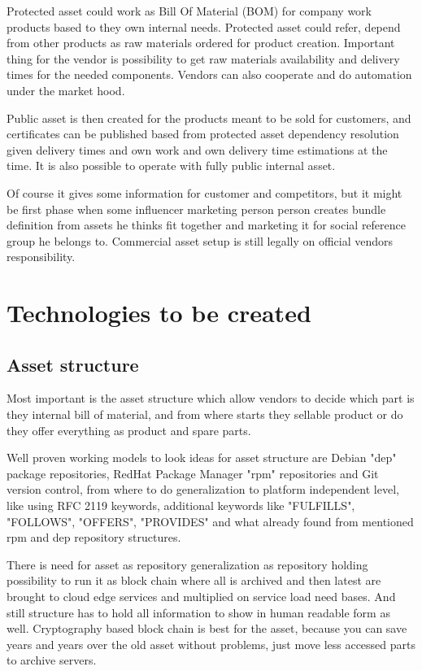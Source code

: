Protected asset could work as Bill Of Material (BOM) for company work products based to they own internal needs. Protected asset could refer, depend from other products as raw materials ordered for product creation. Important thing for the vendor is possibility to get raw materials availability and delivery times for the needed components. Vendors can also cooperate and  do automation under the market hood.

Public asset is then created for the products meant to be sold for customers, and certificates can be published based from protected asset dependency resolution given delivery times and own work and own delivery time estimations at the time. It is also possible to operate with fully public internal asset.

Of course it gives some information for customer and competitors, but it might be first phase when some influencer marketing person person creates bundle definition from assets he thinks fit together and marketing it for social reference group he belongs to. Commercial asset setup is still legally on official vendors responsibility.



\section{Technologies to be created}
\label{technologies}

\subsection{Asset structure}
\label{asset_structure}
Most important is the asset structure which allow vendors to decide which part is they internal bill of material, and from where starts they sellable product or do they offer everything as product and spare parts.

Well proven working models to look ideas for asset structure are Debian "dep" package repositories, RedHat Package Manager "rpm" repositories and Git version control, from where to do generalization to platform independent level, like using RFC 2119\cite{rfc2119} keywords, additional keywords like "FULFILLS", "FOLLOWS", "OFFERS", "PROVIDES" and what already found from mentioned rpm and dep repository structures.

There is need for asset as repository generalization as repository holding possibility to run it as block chain where all is archived and then latest are brought to cloud edge services and multiplied on service load need bases. And still structure has to hold all information to show in human readable form as well. Cryptography based block chain is best for the asset, because you can save years and years over the old asset without problems, just move less accessed parts to archive servers.

